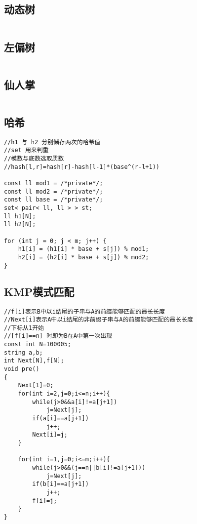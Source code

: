 \documentclass[twocolumn,a4]{article}
\begin{document}
\subsection{动态树}
\begin{lstlisting}

\end{lstlisting}

\subsection{左偏树}
\begin{lstlisting}

\end{lstlisting}

\subsection{仙人掌}
\begin{lstlisting}

\end{lstlisting}

\subsection{哈希}
\begin{lstlisting}
//h1 与 h2 分别储存两次的哈希值
//set 用来判重
//模数与底数选取质数
//hash[l,r]=hash[r]-hash[l-1]*(base^(r-l+1))

const ll mod1 = /*private*/;
const ll mod2 = /*private*/;
const ll base = /*private*/;
set< pair< ll, ll > > st;
ll h1[N];
ll h2[N];

for (int j = 0; j < m; j++) {
    h1[i] = (h1[i] * base + s[j]) % mod1;
    h2[i] = (h2[i] * base + s[j]) % mod2;
}
\end{lstlisting}

\subsection{KMP模式匹配}
\begin{lstlisting}
//f[i]表示B中以i结尾的子串与A的前缀能够匹配的最长长度
//Next[i]表示A中以i结尾的非前缀子串与A的前缀能够匹配的最长长度
//下标从1开始
//[f[i]==n] 时即为B在A中第一次出现
const int N=100005;
string a,b;
int Next[N],f[N];
void pre()
{
    Next[1]=0;
    for(int i=2,j=0;i<=n;i++){
        while(j>0&&a[i]!=a[j+1])
            j=Next[j];
        if(a[i]==a[j+1])
            j++;
        Next[i]=j;
    }

    for(int i=1,j=0;i<=m;i++){
        while(j>0&&(j==n||b[i]!=a[j+1]))
            j=Next[j];
        if(b[i]==a[j+1])
            j++;
        f[i]=j;
    }
}
\end{lstlisting}
\end{document}
